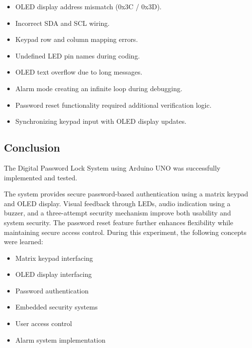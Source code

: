 \begin{itemize}

\item OLED display address mismatch (0x3C / 0x3D).

\item Incorrect SDA and SCL wiring.

\item Keypad row and column mapping errors.

\item Undefined LED pin names during coding.

\item OLED text overflow due to long messages.

\item Alarm mode creating an infinite loop during debugging.

\item Password reset functionality required additional verification logic.

\item Synchronizing keypad input with OLED display updates.

\end{itemize}


\subsection{Conclusion}

The Digital Password Lock System using Arduino UNO was successfully implemented and tested.

The system provides secure password-based authentication using a matrix keypad and OLED display. Visual feedback through LEDs, audio indication using a buzzer, and a three-attempt security mechanism improve both usability and system security. The password reset feature further enhances flexibility while maintaining secure access control.
\clearpage
During this experiment, the following concepts were learned:
\begin{itemize}

\item Matrix keypad interfacing

\item OLED display interfacing

\item Password authentication

\item Embedded security systems

\item User access control

\item Alarm system implementation

\end{itemize}

